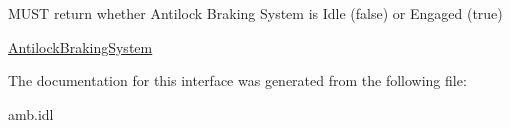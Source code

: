 M\-U\-S\-T return whether Antilock Braking System is Idle (false) or Engaged (true) 

\hyperlink{interfaceVehicle_1_1org_1_1automotive_1_1AntilockBrakingSystem}{Antilock\-Braking\-System} 

The documentation for this interface was generated from the following file\-:\begin{DoxyCompactItemize}
\item 
amb.\-idl\end{DoxyCompactItemize}
